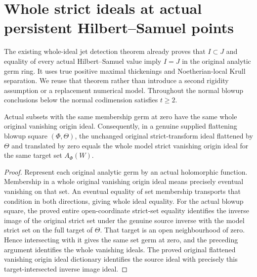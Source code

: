 \section{Whole strict ideals at actual persistent Hilbert--Samuel points}
\label{sec:hironaka-actual-persistent-hs-ideal-rigidity}
The existing whole-ideal jet detection theorem already proves that $I\subset J$ and equality of every actual Hilbert--Samuel value imply $I=J$ in the original analytic germ ring. It uses true positive maximal thickenings and Noetherian-local Krull separation. We reuse that theorem rather than introduce a second rigidity assumption or a replacement numerical model.
Throughout the normal blowup conclusions below the normal codimension satisfies $t\ge2$.

\begin{theorem}
\label{hir:actual-persistent-fixed-source-strict-ideal}
\leanok
Actual subsets with the same membership germ at zero have the same whole original vanishing origin ideal.
Consequently, in a genuine supplied flattening blowup square $(\Phi,\Theta)$, the unchanged original strict-transform ideal flattened by $\Theta$ and translated by zero equals the whole model strict vanishing origin ideal for the same target set $A_\Phi(W)$.
\end{theorem}
\begin{proof}
Represent each original analytic germ by an actual holomorphic function. Membership in a whole original vanishing origin ideal means precisely eventual vanishing on that set.
An eventual equality of set membership transports that condition in both directions, giving whole ideal equality.
For the actual blowup square, the proved entire open-coordinate strict-set equality identifies the inverse image of the original strict set under the genuine source inverse with the model strict set on the full target of $\Theta$.
That target is an open neighbourhood of zero. Hence intersecting with it gives the same set germ at zero, and the preceding argument identifies the whole vanishing ideals.
The proved original flattened vanishing origin ideal dictionary identifies the source ideal with precisely this target-intersected inverse image ideal.
\end{proof}

